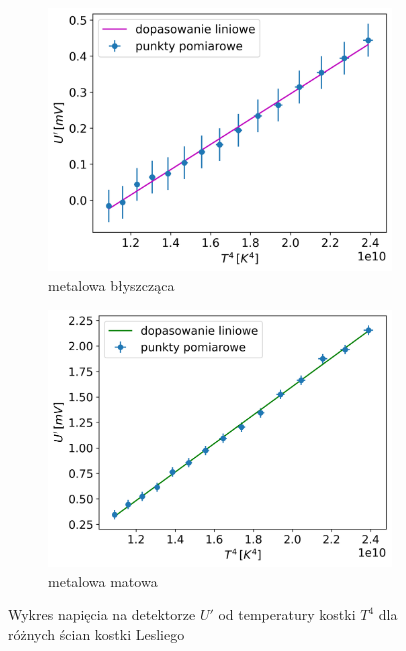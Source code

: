 \documentclass[12pt]{article}
\begin{document}
\begin{figure}[H]
    \vspace{1em}

    \begin{subfigure}{0.45\textwidth}
        \centering
        \includegraphics[width=\linewidth]{cube_shining}
        \caption{metalowa błyszcząca}
        \label{fig:cube_shining}
    \end{subfigure}
    \hfill
    \begin{subfigure}{0.45\textwidth}
        \centering
        \includegraphics[width=\linewidth]{cube_dull}
        \caption{metalowa matowa}
        \label{fig:cube_dull}
    \end{subfigure}
    
    \caption{Wykres napięcia na detektorze $U'$ od temperatury kostki $T^4$ dla różnych ścian kostki Lesliego}
    \label{fig:cube_temp}
\end{figure}
\end{document}
